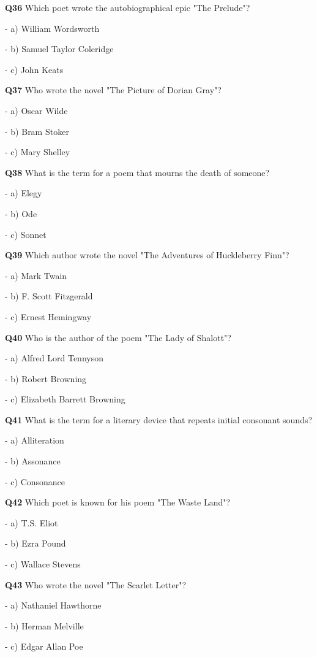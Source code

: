 \textbf{Q36} Which poet wrote the autobiographical epic "The Prelude"?\par
\quad - a) William Wordsworth\par
\quad - b) Samuel Taylor Coleridge\par
\quad - c) John Keats\par

\textbf{Q37} Who wrote the novel "The Picture of Dorian Gray"?\par
\quad - a) Oscar Wilde\par
\quad - b) Bram Stoker\par
\quad - c) Mary Shelley\par

\textbf{Q38} What is the term for a poem that mourns the death of someone?\par
\quad - a) Elegy\par
\quad - b) Ode\par
\quad - c) Sonnet\par

\textbf{Q39} Which author wrote the novel "The Adventures of Huckleberry Finn"?\par
\quad - a) Mark Twain\par
\quad - b) F. Scott Fitzgerald\par
\quad - c) Ernest Hemingway\par

\textbf{Q40} Who is the author of the poem "The Lady of Shalott"?\par
\quad - a) Alfred Lord Tennyson\par
\quad - b) Robert Browning\par
\quad - c) Elizabeth Barrett Browning\par

\textbf{Q41} What is the term for a literary device that repeats initial consonant sounds?\par
\quad - a) Alliteration\par
\quad - b) Assonance\par
\quad - c) Consonance\par

\textbf{Q42} Which poet is known for his poem "The Waste Land"?\par
\quad - a) T.S. Eliot\par
\quad - b) Ezra Pound\par
\quad - c) Wallace Stevens\par

\textbf{Q43} Who wrote the novel "The Scarlet Letter"?\par
\quad - a) Nathaniel Hawthorne\par
\quad - b) Herman Melville\par
\quad - c) Edgar Allan Poe\par

